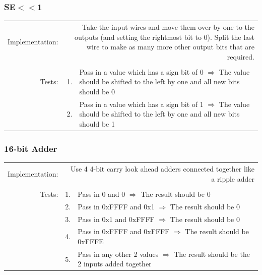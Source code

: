 \documentclass{article}
\begin{document}
		\subsubsection{SE$<<$1}
			\begin{tabular}{ r  r  p{12cm} }
				Implementation: & \multicolumn{2}{p{12.75cm}}{Take the input wires and move them over by one to the outputs (and setting the rightmost bit to 0).  Split the last wire to make as many more other output bits that are required.}\\
				                &    & \\
				         Tests: & 1. & Pass in a value which has a sign bit of 0 $\Rightarrow$ The value should be shifted to the left by one and all new bits should be 0\\
				                & 2. & Pass in a value which has a sign bit of 1 $\Rightarrow$ The value should be shifted to the left by one and all new bits should be 1\\
			\end{tabular}
		\subsubsection{16-bit Adder}
			\begin{tabular}{ r  r  p{12cm} }
				Implementation: & \multicolumn{2}{p{12.75cm}}{Use 4 4-bit carry look ahead adders connected together like a ripple adder}\\
				                &    & \\
				         Tests: & 1. & Pass in 0 and 0 $\Rightarrow$ The result should be 0\\
				                & 2. & Pass in 0xFFFF and 0x1 $\Rightarrow$ The result should be 0\\
				                & 3. & Pass in 0x1 and 0xFFFF $\Rightarrow$ The result should be 0\\
				                & 4. & Pass in 0xFFFF and 0xFFFF $\Rightarrow$ The result should be 0xFFFE\\
				                & 5. & Pass in any other 2 values $\Rightarrow$ The result should be the 2 inputs added together\\
			\end{tabular}
\end{document}
